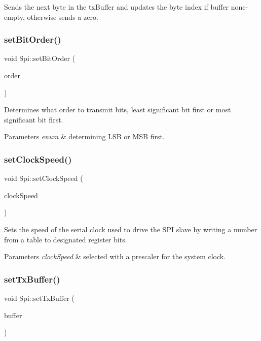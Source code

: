 Sends the next byte in the tx\+Buffer and updates the byte index if buffer none-\/empty, otherwise sends a zero. \mbox{\label{class_spi_aee3ca300877494f2c66be7c99d831ee1}} 
\subsubsection{\texorpdfstring{setBitOrder()}{setBitOrder()}}
{\footnotesize\ttfamily void Spi\+::set\+Bit\+Order (\begin{DoxyParamCaption}\item[{Spi\+Bit\+Order}]{order }\end{DoxyParamCaption})}

Determines what order to transmit bits, least significant bit first or most significant bit first. 
\begin{DoxyParams}{Parameters}
{\em enum} & determining L\+SB or M\+SB first. \\
\hline
\end{DoxyParams}
\mbox{\label{class_spi_af36b174c9f4ab3dcd3d1b24587d396c8}} 
\subsubsection{\texorpdfstring{setClockSpeed()}{setClockSpeed()}}
{\footnotesize\ttfamily void Spi\+::set\+Clock\+Speed (\begin{DoxyParamCaption}\item[{Spi\+Clock\+Speed}]{clock\+Speed }\end{DoxyParamCaption})}

Sets the speed of the serial clock used to drive the S\+PI slave by writing a number from a table to designated register bits.


\begin{DoxyParams}{Parameters}
{\em clock\+Speed} & selected with a prescaler for the system clock. \\
\hline
\end{DoxyParams}
\mbox{\label{class_spi_a11ab7b1a91e22d08a43ae08d94ca447d}} 
\subsubsection{\texorpdfstring{setTxBuffer()}{setTxBuffer()}}
{\footnotesize\ttfamily void Spi\+::set\+Tx\+Buffer (\begin{DoxyParamCaption}\item[{\mbox{\hyperlink{classr2k_1_1ivector}{r2k\+::ivector}}$<$ u8 $>$ \&}]{buffer }\end{DoxyParamCaption})}


